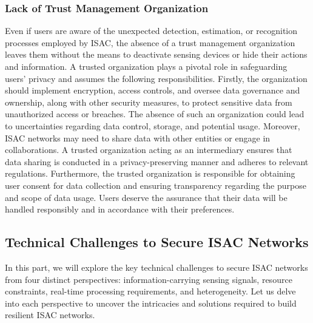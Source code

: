 \documentclass[10pt,journal,twocolumn,twoside]{IEEEtran} %
\begin{document}
\subsubsection{Lack of Trust Management Organization}
Even if users are aware of the unexpected detection, estimation, or recognition processes employed by ISAC, the absence of a trust management organization leaves them without the means to deactivate sensing devices or hide their actions and information. A trusted organization plays a pivotal role in safeguarding users' privacy and assumes the following responsibilities. Firstly, the organization should implement encryption, access controls, and oversee data governance and ownership, along with other security measures, to protect sensitive data from unauthorized access or breaches. The absence of such an organization could lead to uncertainties regarding data control, storage, and potential usage. Moreover, ISAC networks may need to share data with other entities or engage in collaborations. A trusted organization acting as an intermediary ensures that data sharing is conducted in a privacy-preserving manner and adheres to relevant regulations. Furthermore, the trusted organization is responsible for obtaining user consent for data collection and ensuring transparency regarding the purpose and scope of data usage. Users deserve the assurance that their data will be handled responsibly and in accordance with their preferences.

\subsection{Technical Challenges to Secure ISAC Networks}
In this part, we will explore the key technical challenges to secure ISAC networks from four distinct perspectives: information-carrying sensing signals, resource constraints, real-time processing requirements, and heterogeneity. Let us delve into each perspective to uncover the intricacies and solutions required to build resilient ISAC networks.
\end{document}
